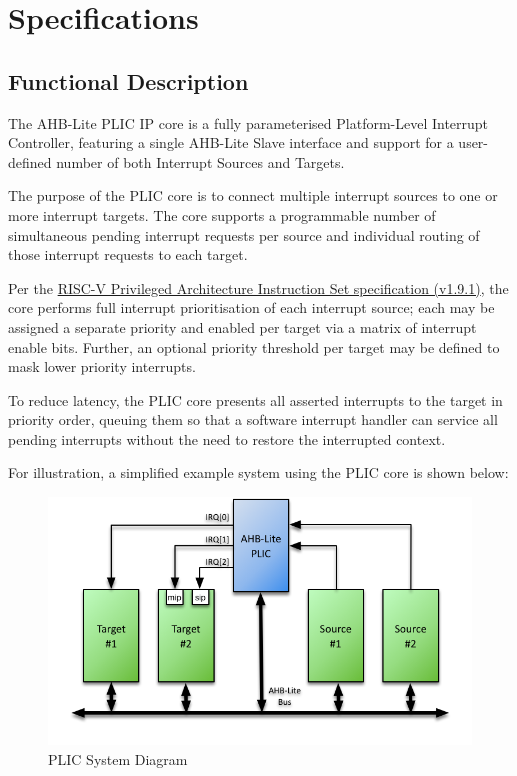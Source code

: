 \chapter{Specifications}

\section{Functional Description}

The AHB-Lite PLIC IP core is a fully parameterised Platform-Level Interrupt
Controller, featuring a single AHB-Lite Slave interface and support for a user-defined number of both Interrupt Sources and Targets.

The purpose of the PLIC core is to connect multiple interrupt sources to
one or more interrupt targets. The core supports a programmable number
of simultaneous pending interrupt requests per source and individual routing of those interrupt requests to each target.

Per the \href{https://github.com/riscv/riscv-isa-manual/blob/master/release/riscv-privileged-v1.9.1.pdf}{RISC-V Privileged Architecture Instruction Set specification (v1.9.1)}, the core performs full interrupt prioritisation of each interrupt source; each may be assigned a separate priority and enabled per target via a matrix of interrupt enable bits. Further, an optional priority threshold per target may be defined to mask lower priority interrupts.

To reduce latency, the PLIC core presents all asserted interrupts to the target in priority order, queuing them so that a software interrupt handler can service all pending interrupts without the need to restore the interrupted context.

For illustration, a simplified example system using the PLIC core is shown below:

\begin{figure}[!htb]

	\includegraphics{img/plic-system.png}
	\caption{PLIC System Diagram}
	\label{fig:SYSDIAG}
\end{figure}

